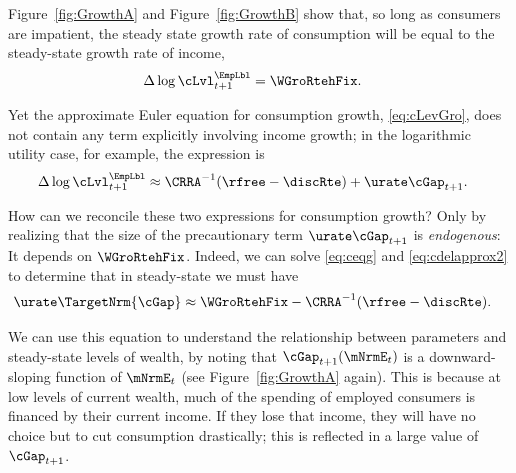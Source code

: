 \documentclass{econark}
\begin{document}
Figure~\ref{fig:GrowthA} and Figure~\ref{fig:GrowthB} show that, so long as
consumers are impatient, the steady state growth rate of consumption
will be equal to the steady-state growth rate of income,
\begin{equation}\begin{gathered}\begin{aligned}
        \Delta \log \cLvl^{\EmpLbl}_{t+1} & =  \WGroRtehFix. \label{eq:ceqg}
\end{aligned}\end{gathered}\end{equation}

Yet the approximate Euler equation for consumption growth, \eqref{eq:cLevGro}, does 
not contain any term explicitly involving income growth; in the logarithmic utility
case, for example, the expression is
\begin{equation}\begin{gathered}\begin{aligned}
         \Delta \log \cLvl^{\EmpLbl}_{t+1} & \approx  \CRRA^{-1}(\rfree-\discRte) +  \urate \cGap _{t+1}. \label{eq:cdelapprox2}
\end{aligned}\end{gathered}\end{equation}

How can we reconcile these two expressions for consumption growth?
Only by realizing that the size of the precautionary term $\urate
\cGap_{t+1}$ is {\it endogenous}: It depends on $\WGroRtehFix$.  Indeed, we
can solve \eqref{eq:ceqg} and \eqref{eq:cdelapprox2} to determine that
in steady-state we must have 
\begin{equation}\begin{gathered}\begin{aligned}
        \urate \TargetNrm{\cGap} & \approx  \WGroRtehFix - \CRRA^{-1}(\rfree-\discRte). \label{eq:prectermSS}
\end{aligned}\end{gathered}\end{equation}

We can use this equation to understand the relationship between
parameters and steady-state levels of wealth, by noting that
$\cGap_{t+1}(\mNrmE_{t})$ is a downward-sloping function of
$\mNrmE_{t}$ (see Figure~\ref{fig:GrowthA} again).  This is because at
low levels of current wealth, much of the spending of employed
consumers is financed by their current income.  If they lose that
income, they will have no choice but to cut consumption drastically; this is
reflected in a large value of $\cGap_{t+1}$.
\end{document}
